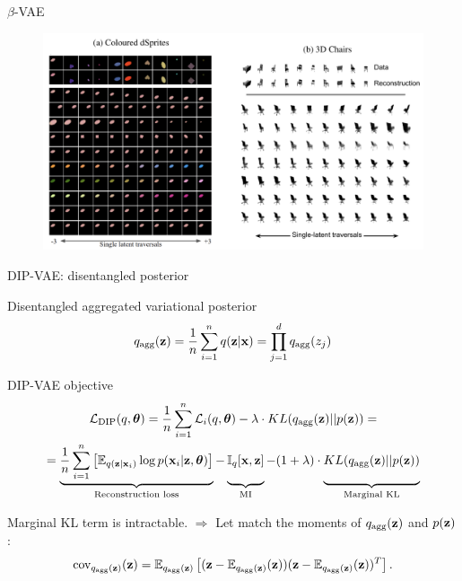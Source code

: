 \documentclass{beamer}
\begin{document}
\begin{frame}{$\beta$-VAE}
	\begin{figure}
		\centering
		\includegraphics[width=1.0\linewidth]{figs/betaVAE_9.png}
	\end{figure}
	
\end{frame}
\begin{frame}{DIP-VAE: disentangled posterior}
	\begin{block}{Disentangled aggregated variational posterior}
		\vspace{-0.3cm}
		\[
		q_{\text{agg}}(\mathbf{z}) = \frac{1}{n} \sum_{i=1}^n q(\mathbf{z} | \mathbf{x}) = \prod_{j=1}^d q_{\text{agg}}(z_j)
		\]
		\vspace{-0.6cm}
	\end{block}
	\begin{block}{DIP-VAE objective}
		\vspace{-0.7cm}
		{\small
			\begin{multline*}
				\cL_{\text{DIP}}(q, \btheta) = \frac{1}{n} \sum_{i=1}^n \cL_i(q, \btheta) -\lambda \cdot KL(q_{\text{agg}}(\bz) || p(\bz)) = \\
				= \underbrace{ \frac{1}{n} \sum_{i=1}^n \left[\bbE_{q(\bz | \bx_i)} \log p(\bx_i | \bz, \btheta)\right]}_{\text{Reconstruction loss}} - \underbrace{\vphantom{\sum_{i=1}^n} \bbI_{q} [\bx, \bz]}_{\text{MI}} - (1 + \lambda) \cdot \underbrace{\vphantom{\sum_{i=1}^n} KL(q_{\text{agg}}(\bz) || p(\bz))}_{\text{Marginal KL}}
			\end{multline*}
		}
		\vspace{-0.3cm}
	\end{block}
	Marginal KL term is intractable. $\Rightarrow$
	Let match the moments of $q_{\text{agg}}(\mathbf{z})$ and $p(\mathbf{z})$:
	\vspace{-0.3cm}
	\[
	\text{cov}_{q_{\text{agg}}(\mathbf{z})}(\mathbf{z}) = \mathbb{E}_{q_{\text{agg}}(\mathbf{z})} \left[ (\mathbf{z} - \mathbb{E}_{q_{\text{agg}}(\mathbf{z})}(\mathbf{z})) (\mathbf{z} - \mathbb{E}_{q_{\text{agg}}(\mathbf{z})}(\mathbf{z}))^T \right].
	\]
\end{frame}
\end{document}
